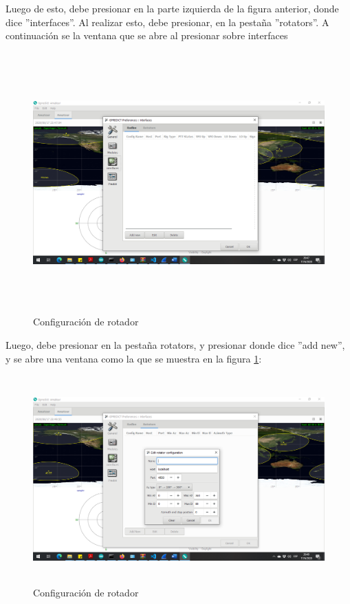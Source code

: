 Luego de esto, debe presionar en la parte izquierda de la figura anterior, donde dice ''interfaces''. Al realizar esto, debe presionar, en la pestaña ''rotators''. A continuación se la ventana que se abre al presionar sobre interfaces
\begin{figure}[H]
	\includegraphics[height=10cm,width=\textwidth]{rotators_int}
	\caption{Configuración de rotador}
\end{figure} 

Luego, debe presionar en la pestaña rotators, y presionar donde dice ''add new'', y se abre una ventana como la que se muestra en la figura \ref{fig:conf_rot_ip}: 

\begin{figure}[h]
	\includegraphics[height=8cm]{conf_rot}
	\caption{Configuración de rotador}
	\label{fig:conf_rot_ip}
\end{figure} 

